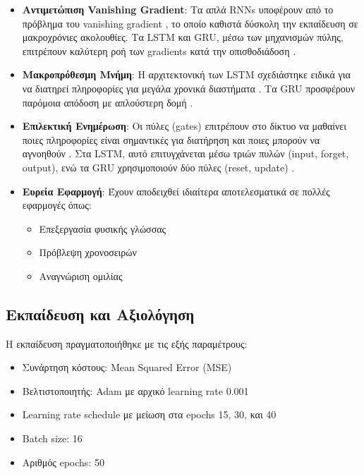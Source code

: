 \documentclass[a4paper,12pt]{article}
\begin{document}
\begin{itemize}
   \item \textbf{Αντιμετώπιση Vanishing Gradient}: Τα απλά RNNs υποφέρουν από το πρόβλημα του vanishing gradient \cite{bengio1994learning}, το οποίο καθιστά δύσκολη την εκπαίδευση σε μακροχρόνιες ακολουθίες. Τα LSTM και GRU, μέσω των μηχανισμών πύλης, επιτρέπουν καλύτερη ροή των gradients κατά την οπισθοδιάδοση \cite{pascanu2013difficulty}.
   
   \item \textbf{Μακροπρόθεσμη Μνήμη}: Η αρχιτεκτονική των LSTM σχεδιάστηκε ειδικά για να διατηρεί πληροφορίες για μεγάλα χρονικά διαστήματα \cite{gers1999learning}. Τα GRU προσφέρουν παρόμοια απόδοση με απλούστερη δομή \cite{chung2014empirical}.
   
   \item \textbf{Επιλεκτική Ενημέρωση}: Οι πύλες (gates) επιτρέπουν στο δίκτυο να μαθαίνει ποιες πληροφορίες είναι σημαντικές για διατήρηση και ποιες μπορούν να αγνοηθούν \cite{greff2016lstm}. Στα LSTM, αυτό επιτυγχάνεται μέσω τριών πυλών (input, forget, output), ενώ τα GRU χρησιμοποιούν δύο πύλες (reset, update) \cite{cho2014properties}.
   
   \item \textbf{Ευρεία Εφαρμογή}: Έχουν αποδειχθεί ιδιαίτερα αποτελεσματικά σε πολλές εφαρμογές όπως:
   \begin{itemize}
       \item Επεξεργασία φυσικής γλώσσας \cite{sutskever2014sequence}
       \item Πρόβλεψη χρονοσειρών \cite{zhang2018deep}
       \item Αναγνώριση ομιλίας \cite{graves2013speech}
   \end{itemize}
\end{itemize}


\subsection*{Εκπαίδευση και Αξιολόγηση}

Η εκπαίδευση πραγματοποιήθηκε με τις εξής παραμέτρους:
\begin{itemize}
   \item Συνάρτηση κόστους: Mean Squared Error (MSE)
   \item Βελτιστοποιητής: Adam με αρχικό learning rate 0.001
   \item Learning rate schedule με μείωση στα epochs 15, 30, και 40
   \item Batch size: 16
   \item Αριθμός epochs: 50
\end{itemize}
\end{document}
